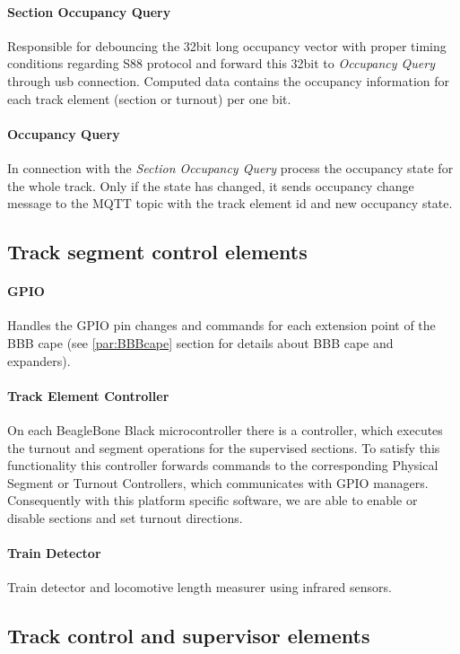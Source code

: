 \paragraph{Section Occupancy Query}
Responsible for debouncing the 32bit long occupancy vector with proper timing conditions regarding S88 protocol and forward this 32bit to \textit{Occupancy Query} through usb connection. Computed data contains the occupancy information for each track element (section or turnout) per one bit.
\paragraph{Occupancy Query}
In connection with the \textit{Section Occupancy Query} process the occupancy state for the whole track. Only if the state has changed, it sends occupancy change message to the MQTT topic with the track element id and new occupancy state.

\subsection{Track segment control elements}
\paragraph{GPIO}
Handles the GPIO pin changes and commands for each extension point of the BBB cape (see \ref{par:BBBcape} section for details about BBB cape and expanders).
\paragraph{Track Element Controller}
On each BeagleBone Black microcontroller there is a controller, which executes the turnout and segment operations for the supervised sections. To satisfy this functionality this controller forwards commands to the corresponding Physical Segment or Turnout Controllers, which communicates with GPIO managers. Consequently with this platform specific software, we are able to enable or disable sections and set turnout directions.
\paragraph{Train Detector}
Train detector and locomotive length measurer using infrared sensors.

\subsection{Track control and supervisor elements}
